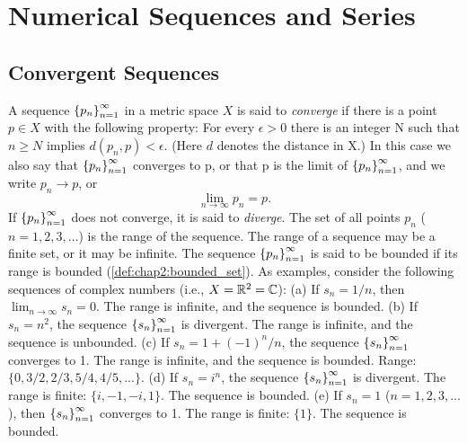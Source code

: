 
\chapter{Numerical Sequences and Series}
\label{chap:rudin3}

\section{Convergent Sequences}
\label{sec:chap3:convergence}

\begin{definition} %
  \label{def:chap3:convergent_sequence}
  A sequence $\left\{ p_n \right\}_{n=1}^\infty$ in a metric space $X$ is said to
  \emph{converge} if there is a point $p \in X$ with the following
  property: For every $\epsilon > 0$ there is an integer N such that
  $n \ge N$ implies $d(p_n, p) < \epsilon$.
  (Here $d$ denotes the distance in X.)
  In this case we also say that $\left\{ p_n \right\}_{n=1}^\infty$ converges to p, or
  that p is the limit of $\left\{ p_n \right\}_{n=1}^\infty$, and we write $p_n \to p$, or
  \[ \lim_{n \to \infty} p_n = p. \]
  If $\left\{ p_n \right\}_{n=1}^\infty$ does not converge, it is said to \emph{diverge}.
  The set of all points $p_n$ ($n=1, 2, 3, \dots$) is the range of
  the sequence. The range of a sequence may be a finite set, or it
  may be infinite. The sequence $\left\{ p_n \right\}_{n=1}^\infty$ is said to be bounded
  if its range is bounded (\autoref{def:chap2:bounded_set}).
  As examples, consider the following sequences of complex numbers
  (i.e., $X = \mathbb{R}^2 = \mathbb{C}$):
  (a) If $s_n = 1/n$, then $\lim_{n \to \infty} s_n = 0$. The range
  is infinite, and the sequence is bounded.
  (b) If $s_n = n^2$, the sequence $\left\{ s_n \right\}_{n=1}^\infty$ is divergent. The
  range is infinite, and the sequence is unbounded.
  (c) If $s_n = 1 + (-1)^n / n$, the sequence $\left\{ s_n \right\}_{n=1}^\infty$
  converges to 1. The range is infinite, and the sequence is bounded.
  Range: $\{0, 3/2, 2/3, 5/4, 4/5, ...\}$.
  (d) If $s_n = i^n$, the sequence $\left\{ s_n \right\}_{n=1}^\infty$ is divergent. The
  range is finite: $\{i, -1, -i, 1\}$. The sequence is bounded.
  (e) If $s_n = 1$ ($n = 1, 2, 3, \dots$), then $\left\{ s_n \right\}_{n=1}^\infty$
  converges to 1. The range is finite: $\{1\}$. The sequence is bounded.
\end{definition}

